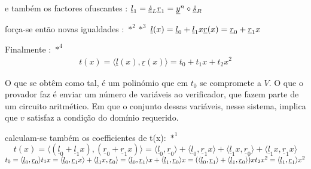 e também os factores ofuscantes : \newline
$\underline{l}_1 = \underline{\dot{s}}_L\\
\underline{r}_1 = \underline{y}^n \circ \underline{\dot{s}}_R$

força-se então novas igualdades : $*^2$$*^3$ \newline
$\underline{l}(x) = \underline{l}_0 + \underline{l}_1 x\\
\underline{r}(x) = \underline{r}_0 + \underline{r}_1 x$

Finalmente : $*^4$
\begin{align*}
t(x) = \langle \underline{l}(x), \underline{r}(x)\rangle = t_0 + t_1 x + t_2 x^2
\end{align*}

O que se obtêm como tal, é um polinómio que em $t_0$ se compromete a $V$. O que o provador faz é enviar um número de variáveis ao verificador, que fazem parte de um circuito aritmético. Em que o conjunto dessas variáveis, nesse sistema, implica que $v$ satisfaz a condição do domínio requerido.\newline

calculam-se também os coefficientes de t(x): $*^1$
\[t(x) = \langle (\underline{l}_0 + \underline{l}_1 x), (\underline{r}_0 + \underline{r}_1 x) \rangle = \langle \underline{l}_0, \underline{r}_0 \rangle + \langle \underline{l}_0, \underline{r}_1 x \rangle + \langle \underline{l}_1 x, \underline{r}_0 \rangle + \langle \underline{l}_1 x, \underline{r}_1 x \rangle\]
\newline
$t_0 = \langle \underline{l}_0, \underline{r}_0 \rangle\\
t_1 x = \langle \underline{l}_0, \underline{r}_1 x \rangle + \langle \underline{l}_1 x, \underline{r}_0 \rangle = \langle \underline{l}_0, \underline{r}_1 \rangle x + \langle \underline{l}_1, \underline{r}_0 \rangle x = (\langle \underline{l}_0, \underline{r}_1 \rangle + \langle \underline{l}_1, \underline{r}_0 \rangle ) x\\
t_2 x^2 = \langle \underline{l}_1, \underline{r}_1 \rangle x^2$

